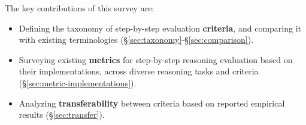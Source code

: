 The key contributions of this survey are:
\begin{itemize}
    \item Defining the taxonomy of step-by-step evaluation \textbf{criteria}, and comparing it with existing terminologies (\S\ref{sec:taxonomy}-\S\ref{sec:comparison}).
    \item Surveying existing \textbf{metrics} for step-by-step reasoning evaluation based on their implementations, across diverse reasoning tasks and criteria (\S\ref{sec:metric-implementations}).
    \item Analyzing \textbf{transferability} between criteria based on reported empirical results (\S\ref{sec:transfer}).
\end{itemize}